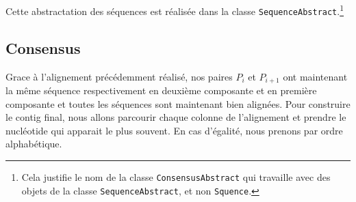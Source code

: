 Cette abstractation des séquences est réalisée dans la classe
\verb|SequenceAbstract|.\footnote{Cela justifie le nom de la classe
	\verb|ConsensusAbstract| qui travaille avec des objets de la classe
\verb|SequenceAbstract|, et non \verb|Squence|.}

\subsection{Consensus}
\label{subsection:consensus}

Grace à l'alignement précédemment réalisé, nos paires $P_{i}$ et $P_{i + 1}$ ont
maintenant la même séquence respectivement en deuxième composante et en première
composante et toutes les séquences sont maintenant bien alignées. Pour
construire le contig final, nous allons parcourir chaque colonne de l'alignement
et prendre le nucléotide qui apparait le plus souvent. En cas d'égalité, nous
prenons par ordre alphabétique.


